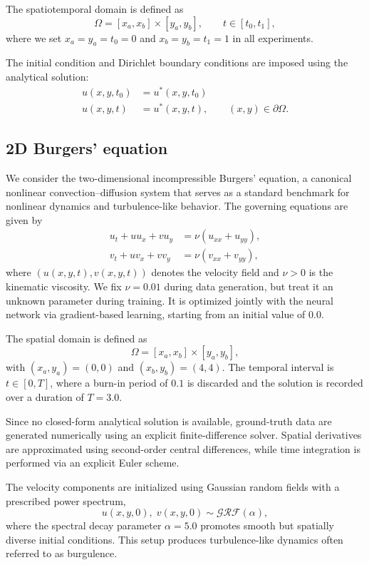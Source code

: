\documentclass{article}
\theoremstyle{plain}
\theoremstyle{definition}
\theoremstyle{remark}
\begin{document}
The spatiotemporal domain is defined as
\begin{equation}
    \Omega = [x_a, x_b] \times [y_a, y_b], \qquad t \in [t_0, t_1],
\end{equation}
where we set $x_a = y_a = t_0 = 0$ and $x_b = y_b = t_1 = 1$ in all experiments.

The initial condition and Dirichlet boundary conditions are imposed using the analytical solution:
\begin{align}
    u(x,y,t_0) &= u^*(x,y,t_0) \\
    u(x,y,t) &= u^*(x,y,t), \qquad (x,y) \in \partial \Omega.
\end{align}

\subsection{2D Burgers' equation}

We consider the two-dimensional incompressible Burgers’ equation, a canonical nonlinear convection–diffusion system that serves as a standard benchmark for nonlinear dynamics and turbulence-like behavior. The governing equations are given by
\begin{align}
u_t + u u_x + v u_y &= \nu (u_{xx} + u_{yy}), \\
v_t + u v_x + v v_y &= \nu (v_{xx} + v_{yy}),
\end{align}
where $(u(x,y,t), v(x,y,t))$ denotes the velocity field and $\nu > 0$ is the kinematic viscosity. We fix $\nu=0.01$ during data generation, but treat it an unknown parameter during training. It is optimized jointly with the neural network via gradient-based learning, starting from an initial value of $0.0$.

The spatial domain is defined as
\begin{equation}
\Omega = [x_a, x_b] \times [y_a, y_b],
\end{equation}
with $(x_a, y_a) = (0, 0)$ and $(x_b, y_b) = (4, 4)$.
The temporal interval is $t \in [0, T]$, where a burn-in period of $0.1$ is discarded and the solution is recorded over a duration of $T = 3.0$.

Since no closed-form analytical solution is available, ground-truth data are generated numerically using an explicit finite-difference solver. Spatial derivatives are approximated using second-order central differences, while time integration is performed via an explicit Euler scheme.

The velocity components are initialized using Gaussian random fields with a prescribed power spectrum,
\begin{equation}
    u(x,y,0),\; v(x,y,0) \sim \mathcal{GRF}(\alpha),
\end{equation}
where the spectral decay parameter $\alpha = 5.0$ promotes smooth but spatially diverse initial conditions. This setup produces turbulence-like dynamics often referred to as burgulence.
\end{document}
